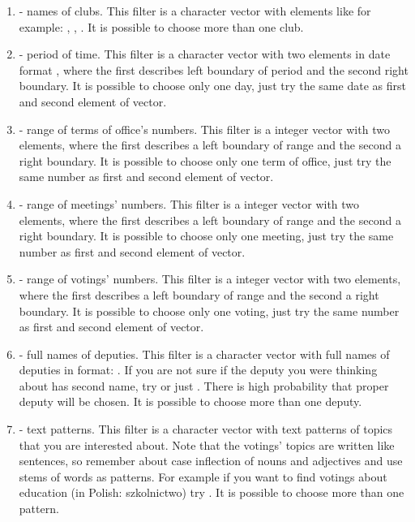 \begin{enumerate}
\item {} - names of clubs. This filter is a character vector with elements like for example: , , . It is possible to choose more than one club.
\item {} - period of time. This filter is a character vector with two elements in date format , where the first describes left boundary of period and the second right boundary. It is possible to choose only one day, just try the same date as first and second element of vector.
\item {} - range of terms of office's numbers. This filter is a integer vector with two elements, where the first describes a left boundary of range and the second a right boundary. It is possible to choose only one term of office, just try the same number as first and second element of vector.
\item {} - range of meetings' numbers. This filter is a integer vector with two elements, where the first describes a left boundary of range and the second a right
boundary. It is possible to choose only one meeting, just try the same number as first and second element of vector.
\item {} - range of votings' numbers. This filter is a integer vector with two 
elements, where the first describes a left boundary of range and the second a right boundary. It is possible to choose only one voting, just try the same number as first and second element of vector.
\item {} - full names of deputies. This filter is a character vector with full names of deputies in format: . If you are not sure if the deputy you were thinking about has second name, try  or just . There is high probability that proper deputy will be chosen. 
It is possible to choose more than one deputy.
\item {} - text patterns. This filter is a character vector with text patterns of topics that you are interested about. Note that the votings' topics are written like
sentences, so remember about case inflection of nouns and adjectives and use stems of
words as patterns. For example if you want to find votings about education (in Polish:
szkolnictwo) try . It is possible to choose more than one pattern.
\end{enumerate}

